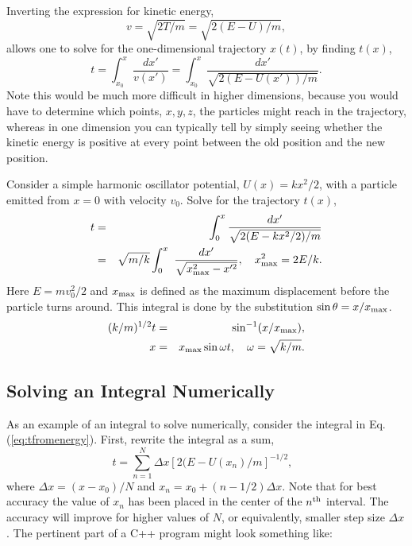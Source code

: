 Inverting the expression for kinetic energy,
\begin{equation}
v=\sqrt{2T/m}=\sqrt{2(E-U)/m},
\end{equation}
allows one to solve for the one-dimensional trajectory $x(t)$, by finding $t(x)$,
\begin{equation}
\label{eq:tfromenergy}
t=\int_{x_0}^x \frac{dx'}{v(x')}=\int_{x_0}^x\frac{dx'}{\sqrt{2(E-U(x'))/m}}.
\end{equation}
Note this would be much more difficult in higher dimensions, because you would have to determine which points, $x,y,z$, the particles might reach in the trajectory, whereas in one dimension you can typically tell by simply seeing whether the kinetic energy is positive at every point between the old position and the new position.

\example
Consider a simple harmonic oscillator potential, $U(x)=kx^2/2$, with a particle emitted from $x=0$ with velocity $v_0$. Solve for the trajectory $t(x)$,
\begin{eqnarray}
t&=&\int_{0}^x \frac{dx'}{\sqrt{2(E-kx^2/2)/m}}\\
\nonumber
&=&\sqrt{m/k}\int_0^x~\frac{dx'}{\sqrt{x_{\rm max}^2-x^{\prime 2}}},~~~x_{\rm max}^2=2E/k.
\end{eqnarray}
Here $E=mv_0^2/2$ and $x_{\rm max}$ is defined as the maximum displacement before the particle turns around. This integral is done by the substitution $\sin\theta=x/x_{\rm max}$. 
\begin{eqnarray}
(k/m)^{1/2}t&=&\sin^{-1}(x/x_{\rm max}),\\
\nonumber
x&=&x_{\rm max}\sin\omega t,~~~\omega=\sqrt{k/m}.
\end{eqnarray}
\exampleend

\subsection{Solving an Integral Numerically}
\label{sec:numintegral}

As an example of an integral to solve numerically, consider the integral in Eq. (\ref{eq:tfromenergy}). First, rewrite the integral as a sum,
\begin{equation}
t=\sum_{n=1}^N \Delta x [2(E-U(x_n)/m]^{-1/2}, ~~~
\end{equation}
where $\Delta x=(x-x_0)/N$ and $x_n=x_0+(n-1/2)\Delta x$. Note that for best accuracy the value of $x_n$ has been placed in the center of the $n^{\rm th}$ interval. The accuracy will improve for higher values of $N$, or equivalently, smaller step size $\Delta x$. The pertinent part of a C++ program might look something like:

